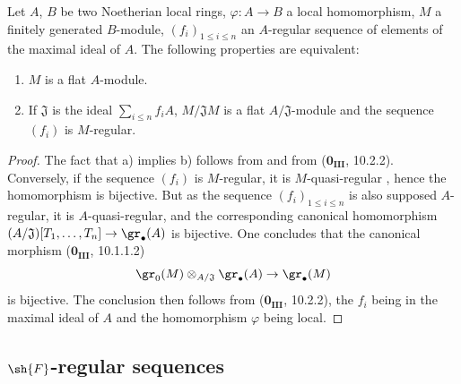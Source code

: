 \begin{proposition}[15.1.21]
\label{0.15.1.21}
Let $A$, $B$ be two Noetherian local rings, $\varphi:A\to B$ a local homomorphism, $M$ a finitely generated $B$-module, $(f_i)_{1\leq i\leq n}$ an $A$-regular sequence of elements of the maximal ideal of $A$.
The following properties are equivalent:
\begin{enumerate}
  \item[a)] $M$ is a flat $A$-module.
  \item[b)] If $\mathfrak{J}$ is the ideal $\sum_{i\leq n}f_iA$, $M/\mathfrak{J}M$ is a flat $A/\mathfrak{J}$-module and the sequence $(f_i)$ is $M$-regular.
\end{enumerate}
\end{proposition}

\begin{proof}
The fact that a) implies b) follows from  and from ($\mathbf{0_{III}}$, 10.2.2).
Conversely, if the sequence $(f_i)$ is $M$-regular, it is $M$-quasi-regular , hence the homomorphism  is bijective.
But as the sequence $(f_i)_{1\leq i\leq n}$ is also supposed $A$-regular, it is $A$-quasi-regular, and the corresponding canonical homomorphism $(A/\mathfrak{J})[T_1,\ldots,T_n]\to\gr_\bullet(A)$ is bijective.
One concludes that the canonical morphism ($\mathbf{0_{III}}$, 10.1.1.2)
\[
  \gr_0(M)\otimes_{A/\mathfrak{J}}\gr_\bullet(A) \to \gr_\bullet(M)
\]
is bijective.
The conclusion then follows from ($\mathbf{0_{III}}$, 10.2.2), the $f_i$ being in the maximal ideal of $A$ and the homomorphism $\varphi$ being local.
\end{proof}

\subsection{\texorpdfstring{$\sh{F}$}{F}-regular sequences}
\label{subsection:0.15.2}

